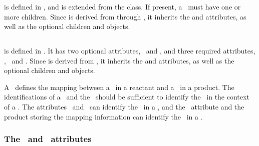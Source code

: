 \subsubsection{}
\label{def:ListOfSpeciesTypeComponentMapsInProduct}

 is defined in , and is extended from the  class. If present, a \listOfSpeciesTypeComponentMapsInProduct\ must have one or more \SpeciesTypeComponentMapInProduct children.  Since  is derived from  through , it inherits the  and  attributes, as well as the optional children  and  objects. 

\clearpage

\subsection{}
\label{def:SpeciesTypeComponentMapInProduct}

 is defined in . It has two optional attributes, \idAtt\ and \nameAtt, and three required attributes, \reactantAtt, \reactantComponentAtt\ and \productComponentAtt. Since  is derived from , it inherits the  and  attributes, as well as the optional children  and  objects. 

A \speciesTypeComponentMapInProduct\ defines the mapping between a \component\ in a reactant and a \component\ in a product.  The identifications of a \componentWR\ and the \speciesReference\ should be sufficient to identify the \component\ in the context of a \reaction. The attributes \reactantAtt\ and \reactantComponentAtt\ can identify the \component\ in a \reactant, and the \productComponentAtt\ attribute and the product storing the mapping information can identify the \component\ in a \product. 


\subsubsection{The \idAtt\ and \nameAtt\ attributes}
\label{def:SpeciesTypeComponentMapInProduct:idAndName}

